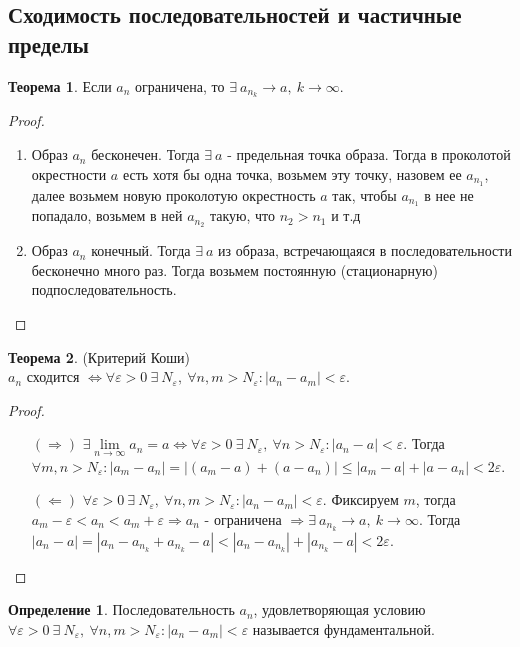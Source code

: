 \documentclass[a4paper, 12pt]{article}
\renewcommand{\epsilon}{\varepsilon}
\newcommand{\lra}{\Leftrightarrow}
\newcommand\tab[1][.5cm]{\hspace*{#1}}
\newcommand{\lims}{\lim\limits_{n\to \infty}}
\theoremstyle{definition}
\newtheorem*{definition}{Определение}
\newtheorem*{theorem}{Теорема}
\begin{document}
    \subsection{Сходимость последовательностей и частичные пределы}
        \begin{theorem}
            Если $a_n$ ограничена, то $\exists\ a_{n_k}\to a,\ k\to \infty$. 
        \end{theorem}
        \begin{proof}\tab
            \begin{enumerate}
                \item Образ $a_n$ бесконечен. Тогда $\exists\ a$ - предельная точка образа. Тогда в проколотой окрестности $a$ есть хотя бы одна точка, возьмем эту точку, назовем ее $a_{n_1}$, далее возьмем новую проколотую окрестность $a$ так, чтобы $a_{n_1}$ в нее не попадало, возьмем в ней $a_{n_2}$ такую, что $n_2>n_1$ и т.д
                \item Образ $a_n$ конечный. Тогда $\exists\ a$ из образа, встречающаяся в последовательности бесконечно много раз. Тогда возьмем постоянную (стационарную) подпоследовательность.
            \end{enumerate}
        \end{proof} 
        \begin{theorem} (Критерий Коши)\\
            $a_n$ сходится $\lra \forall \epsilon>0\ \exists\ N_{\epsilon},\ \forall n,m>N_{\epsilon}: |a_n-a_m|<\epsilon$.
        \end{theorem} 
        \begin{proof}\tab
            \begin{itemize}
                \item[$(\Rightarrow)$] $\exists \lims a_n =a \lra \forall \epsilon>0\ \exists\ N_{\epsilon},\ \forall n>N_{\epsilon}: |a_n-a|<\epsilon$. Тогда $\forall m,n>N_{\epsilon}: |a_m-a_n|=|(a_m-a)+(a-a_n)|\leq |a_m-a|+|a-a_n|<2\epsilon$. 
                \item[$(\Leftarrow)$] $\forall \epsilon>0\ \exists\ N_{\epsilon},\ \forall n,m>N_{\epsilon}: |a_n-a_m|<\epsilon$. Фиксируем $m$, тогда\\ $a_m-\epsilon<a_n<a_m+\epsilon \Rightarrow a_n$ - ограничена $\Rightarrow \exists\ a_{n_k}\to a,\ k\to \infty$. Тогда $|a_n-a|=|a_n-a_{n_k}+a_{n_k}-a|<|a_n-a_{n_k}|+|a_{n_k}-a|<2\epsilon$. 
            \end{itemize}
        \end{proof} 
        \begin{definition}
            Последовательность $a_n$, удовлетворяющая условию\\ $\forall \epsilon>0\ \exists\ N_{\epsilon},\ \forall n,m>N_{\epsilon}: |a_n-a_m|<\epsilon$ называется фундаментальной.
        \end{definition} 
\end{document}

